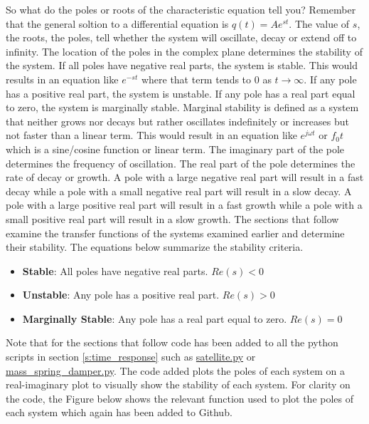 So what do the poles or roots of the characteristic equation tell you? Remember that the general soltion to a differential equation is $q(t) = Ae^{st}$. The value of $s$, the roots, the poles, tell whether the system will oscillate, decay or extend off to infinity. The location of the poles in the complex plane determines the stability of the system. If all poles have negative real parts, the system is stable. This would results in an equation like $e^{-st}$ where that term tends to 0 as $t \rightarrow \infty$. If any pole has a positive real part, the system is unstable. If any pole has a real part equal to zero, the system is marginally stable. Marginal stability is defined as a system that neither grows nor decays but rather oscillates indefinitely or increases but not faster than a linear term. This would result in an equation like $e^{j\omega t}$  or $f_0 t$ which is a sine/cosine function or linear term. The imaginary part of the pole determines the frequency of oscillation. The real part of the pole determines the rate of decay or growth. A pole with a large negative real part will result in a fast decay while a pole with a small negative real part will result in a slow decay. A pole with a large positive real part will result in a fast growth while a pole with a small positive real part will result in a slow growth. The sections that follow examine the transfer functions of the systems examined earlier and determine their stability. The equations below summarize the stability criteria.
\begin{itemize}
    \item {\bf Stable}: All poles have negative real parts. $Re(s) < 0$
    \item {\bf Unstable}: Any pole has a positive real part. $Re(s) > 0$
    \item {\bf Marginally Stable}: Any pole has a real part equal to zero. $Re(s) = 0$
\end{itemize}
Note that for the sections that follow code has been added to all the python scripts in section \ref{s:time_response} such as \href{https://github.com/cmontalvo251/Python/blob/master/controls/satellite.py}{satellite.py} or \href{https://github.com/cmontalvo251/Python/blob/master/controls/mass_spring_damper.py}{mass\_spring\_damper.py}. The code added plots the poles of each system on a real-imaginary plot to visually show the stability of each system. For clarity on the code, the Figure below shows the relevant function used to plot the poles of each system which again has been added to Github.
